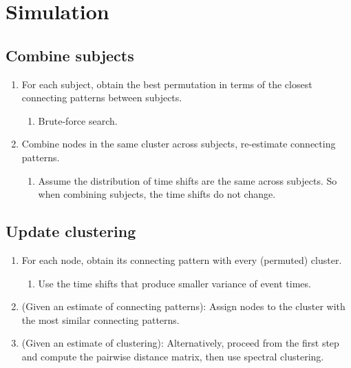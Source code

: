 
\section{Simulation} \label{sec:simulation}


\subsection*{Combine subjects}
\begin{enumerate}
\item For each subject, obtain the best permutation in terms of the closest connecting patterns between subjects.
\begin{enumerate}
\item Brute-force search.
\end{enumerate}

\item Combine nodes in the same cluster across subjects, re-estimate  connecting patterns.
\begin{enumerate}
\item Assume the distribution of time shifts are the same across subjects. So when combining subjects, the time shifts do not change. 
\end{enumerate}

\end{enumerate}


\subsection*{Update clustering}
\begin{enumerate}
\item For each node, obtain its connecting pattern with every (permuted) cluster. 
\begin{enumerate}
\item Use the time shifts that produce smaller variance of event times.
\end{enumerate}

\item (Given an estimate of connecting patterns): Assign nodes to the cluster with the most similar connecting patterns.

\item (Given an estimate of clustering): Alternatively, proceed from the first step and compute the pairwise distance matrix, then use spectral clustering.
\end{enumerate}

